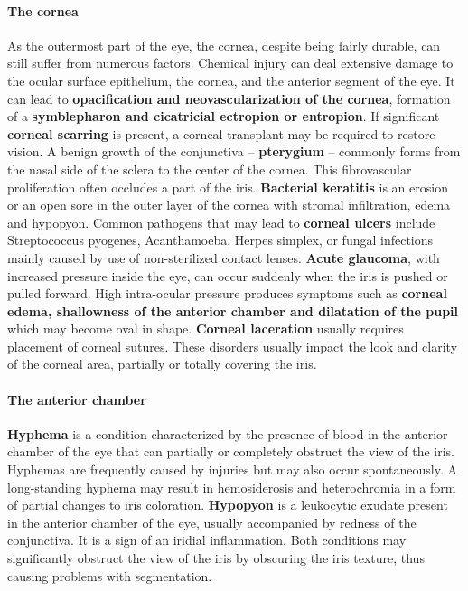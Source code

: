 \documentclass[article,12pt]{elsarticle}
\begin{document}
\paragraph{\textbf{The cornea}} As the outermost part of the eye, the cornea, despite being fairly durable, can still suffer from numerous factors. Chemical injury can deal extensive damage to the ocular surface epithelium, the cornea, and the anterior segment of the eye. It can lead to \textbf{opacification and neovascularization of the cornea}, formation of a \textbf{symblepharon and cicatricial ectropion or entropion}. If significant \textbf{corneal scarring} is present, a corneal transplant may be required to restore vision. A benign growth of the conjunctiva -- \textbf{pterygium} -- commonly forms from the nasal side of the sclera to the center of the cornea. This fibrovascular proliferation often occludes a part of the iris. \textbf{Bacterial keratitis} is an erosion or an open sore in the outer layer of the cornea with stromal infiltration, edema and hypopyon. Common pathogens that may lead to \textbf{corneal ulcers} include Streptococcus pyogenes, Acanthamoeba, Herpes simplex, or fungal infections mainly caused by use of non-sterilized contact lenses. \textbf{Acute glaucoma}, with increased pressure inside the eye, can occur suddenly when the iris is pushed or pulled forward. High intra-ocular pressure produces symptoms such as \textbf{corneal edema, shallowness of the anterior chamber and dilatation of the pupil} which may become oval in shape. \textbf{Corneal laceration} usually requires placement of corneal sutures. These disorders usually impact the look and clarity of the corneal area, partially or totally covering the iris.

\paragraph{\textbf{The anterior chamber}} \textbf{Hyphema} is a condition characterized by the presence of blood in the anterior chamber of the eye that can partially or completely obstruct the view of the iris. Hyphemas are frequently caused by injuries but may also occur spontaneously. A long-standing hyphema may result in hemosiderosis and heterochromia in a form of partial changes to iris coloration. \textbf{Hypopyon} is a leukocytic exudate present in the anterior chamber of the eye, usually accompanied by redness of the conjunctiva. It is a sign of an iridial inflammation. Both conditions may significantly obstruct the view of the iris by obscuring the iris texture, thus causing problems with segmentation.
\end{document}
